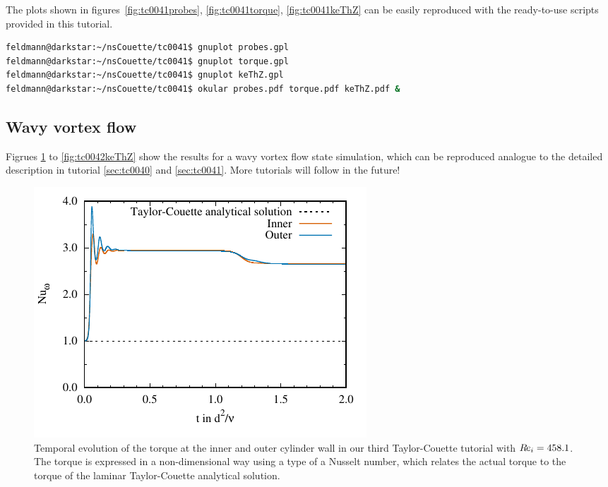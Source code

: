 \documentclass[a4paper, 11pt, DIV=11]{scrartcl}
\begin{document}
The plots shown in figures~\ref{fig:tc0041probes}, \ref{fig:tc0041torque},
\ref{fig:tc0041keThZ} can be easily reproduced with the ready-to-use
 scripts provided in this tutorial.
\begin{lstlisting}[language=bash]
feldmann@darkstar:~/nsCouette/tc0041$ gnuplot probes.gpl
feldmann@darkstar:~/nsCouette/tc0041$ gnuplot torque.gpl
feldmann@darkstar:~/nsCouette/tc0041$ gnuplot keThZ.gpl
feldmann@darkstar:~/nsCouette/tc0041$ okular probes.pdf torque.pdf keThZ.pdf &
\end{lstlisting}











\subsection{Wavy vortex flow}
\label{sec:tc0042}

Figrues \ref{fig:tc0042torque} to \ref{fig:tc0042keThZ} show the results for
a wavy vortex flow state simulation, which can be reproduced analogue to the
detailed description in tutorial \ref{sec:tc0040} and \ref{sec:tc0041}. More
tutorials will follow in the future!



\begin{figure}[htb]
\centering
\includegraphics[scale=1.0]{figures/tc0042/torque}
\caption{Temporal evolution of the torque at the inner and outer cylinder
wall in our third Taylor-Couette tutorial  with $R\hspace{-0.1em}e_{i}=\num{458.1}$.
The torque is expressed in a non-dimensional way using a type of a Nusselt
number, which relates the actual torque to the torque of the laminar
Taylor-Couette analytical solution.}
\label{fig:tc0042torque}
\end{figure}
\end{document}
